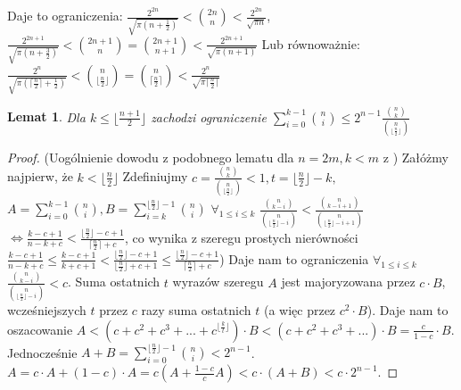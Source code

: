 \documentclass{pracamgr}
\newtheorem{lemma}[theorem]{Lemat}
\begin{document}
   Daje to ograniczenia:
   $\frac{2^{2n}}{\sqrt{\pi(n+\frac{1}{2})}}<{2n\choose n}<\frac{2^{2n}}{\sqrt{\pi n}}$,\quad\quad
   $\frac{2^{2n+1}}{\sqrt{\pi(n+\frac{3}{2})}}<{2n+1\choose n}={2n+1\choose n+1}<\frac{2^{2n+1}}{\sqrt{\pi(n+1)}}$\newline
   Lub równoważnie:
   $\frac{2^n}{\sqrt{\pi(\lceil\frac{n}{2}\rceil+\frac{1}{2})}}<{n\choose\lfloor\frac{n}{2}\rfloor}
   ={n\choose\lceil\frac{n}{2}\rceil}<\frac{2^n}{\sqrt{\pi\lceil\frac{n}{2}\rceil}}$
   \begin{lemma}\label{binomial sum upper bound}
    Dla $k\le\lfloor\frac{n+1}{2}\rfloor$ zachodzi ograniczenie $\sum_{i=0}^{k-1}{n\choose i}\le2^{n-1}\frac{{n\choose k}}{{n\choose \lfloor\frac{n}{2}\rfloor}}$
   \end{lemma}
   \begin{proof}
    (Uogólnienie dowodu z podobnego lematu dla $n=2m,k<m$ z \cite{LPV})\newline%
    Załóżmy najpierw, że $k<\lfloor\frac{n}{2}\rfloor$\newline
    Zdefiniujmy $c=\frac{{n\choose k}}{{n\choose \lfloor\frac{n}{2}\rfloor}}<1,t=\lfloor\frac{n}{2}\rfloor-k,$
    $A=\sum_{i=0}^{k-1}{n\choose i}, B=\sum_{i=k}^{\lfloor\frac{n}{2}\rfloor-1}{n\choose i}$\newline
    $\forall_{1\le i\le k}$ $\frac{{n\choose k-i}}{{n\choose \lfloor\frac{n}{2}\rfloor-i}}<\frac{{n\choose k-i+1}}{{n\choose \lfloor\frac{n}{2}\rfloor-i+1}}$
    $\Leftrightarrow \frac{k-c+1}{n-k+c}<\frac{\lfloor\frac{n}{2}\rfloor-c+1}{\lceil\frac{n}{2}\rceil+c}$,\newline
    co wynika z szeregu prostych nierówności $\frac{k-c+1}{n-k+c}\le\frac{k-c+1}{k+c+1}
    <\frac{\lfloor\frac{n}{2}\rfloor-c+1}{\lfloor\frac{n}{2}\rfloor+c+1}\le\frac{\lfloor\frac{n}{2}\rfloor-c+1}{\lceil\frac{n}{2}\rceil+c}$)\newline
    Daje nam to ograniczenia $\forall_{1\le i\le k}$ $\frac{{n\choose k-i}}{{n\choose \lfloor\frac{n}{2}\rfloor-i}}<c$.\newline
    Suma ostatnich $t$ wyrazów szeregu $A$ jest majoryzowana przez $c\cdot B$, wcześniejszych $t$ przez $c$ razy suma ostatnich $t$ (a więc przez $c^2\cdot B$).
    Daje nam to oszacowanie $A<(c+c^2+c^3+...+c^{\lfloor\frac{k}{t}\rfloor})\cdot B<(c+c^2+c^3+...)\cdot B=\frac{c}{1-c}\cdot B$.
    Jednocześnie $A+B=\sum_{i=0}^{\lfloor\frac{n}{2}\rfloor-1}{n\choose i}<2^{n-1}$.
    $A=c\cdot A+(1-c)\cdot A=c(A+\frac{1-c}{c}A)<c\cdot(A+B)<c\cdot 2^{n-1}$.\newline

\end{proof}
\end{document}
